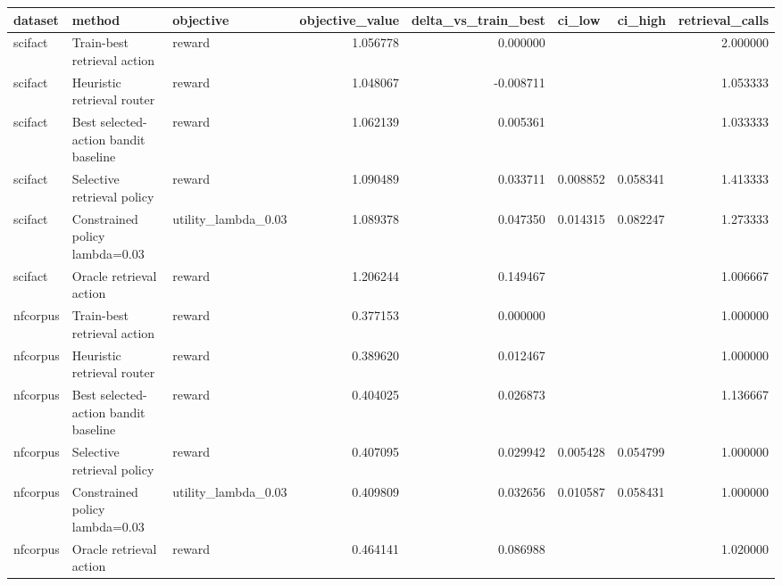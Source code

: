 \begin{tabular}{lllrrllr}
\toprule
dataset & method & objective & objective_value & delta_vs_train_best & ci_low & ci_high & retrieval_calls \\
\midrule
scifact & Train-best retrieval action & reward & 1.056778 & 0.000000 &  &  & 2.000000 \\
scifact & Heuristic retrieval router & reward & 1.048067 & -0.008711 &  &  & 1.053333 \\
scifact & Best selected-action bandit baseline & reward & 1.062139 & 0.005361 &  &  & 1.033333 \\
scifact & Selective retrieval policy & reward & 1.090489 & 0.033711 & 0.008852 & 0.058341 & 1.413333 \\
scifact & Constrained policy lambda=0.03 & utility_lambda_0.03 & 1.089378 & 0.047350 & 0.014315 & 0.082247 & 1.273333 \\
scifact & Oracle retrieval action & reward & 1.206244 & 0.149467 &  &  & 1.006667 \\
nfcorpus & Train-best retrieval action & reward & 0.377153 & 0.000000 &  &  & 1.000000 \\
nfcorpus & Heuristic retrieval router & reward & 0.389620 & 0.012467 &  &  & 1.000000 \\
nfcorpus & Best selected-action bandit baseline & reward & 0.404025 & 0.026873 &  &  & 1.136667 \\
nfcorpus & Selective retrieval policy & reward & 0.407095 & 0.029942 & 0.005428 & 0.054799 & 1.000000 \\
nfcorpus & Constrained policy lambda=0.03 & utility_lambda_0.03 & 0.409809 & 0.032656 & 0.010587 & 0.058431 & 1.000000 \\
nfcorpus & Oracle retrieval action & reward & 0.464141 & 0.086988 &  &  & 1.020000 \\
\bottomrule
\end{tabular}
